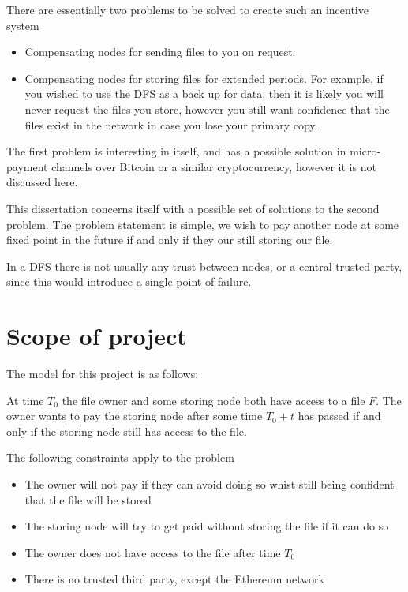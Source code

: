 \documentclass[12pt,a4paper,twoside,openright]{report}
\begin{document}
There are essentially two problems to be solved to create such an incentive system
\begin{itemize}
\item Compensating nodes for sending files to you on request.

\item Compensating nodes for storing files for extended periods.
For example, if you wished to use the DFS as a back up for data, then it is likely you will never request the files you store,
however you still want confidence that the files exist in the network in case you lose your primary copy.
\end{itemize}

The first problem is interesting in itself, and has a possible solution in micro-payment channels over Bitcoin or a similar cryptocurrency,
however it is not discussed here.

This dissertation concerns itself with a possible set of solutions to the second problem.
The problem statement is simple, we wish to pay another node at some fixed point in the future if and only if they our still storing our file.

In a DFS there is not usually any trust between nodes, or a central trusted party, since this would introduce a single point of failure.


\section{Scope of project}

The model for this project is as follows:

At time $T_0$ the file owner and some storing node both have access to a file $F$. The owner wants to pay the storing node
after some time $T_0 + t$ has passed if and only if the storing node still has access to the file.

The following constraints apply to the problem
\begin{itemize}
\item The owner will not pay if they can avoid doing so whist still being confident that the file will be stored
\item The storing node will try to get paid without storing the file if it can do so
\item The owner does not have access to the file after time $T_0$
\item There is no trusted third party, except the Ethereum network
\end{itemize}
\end{document}
